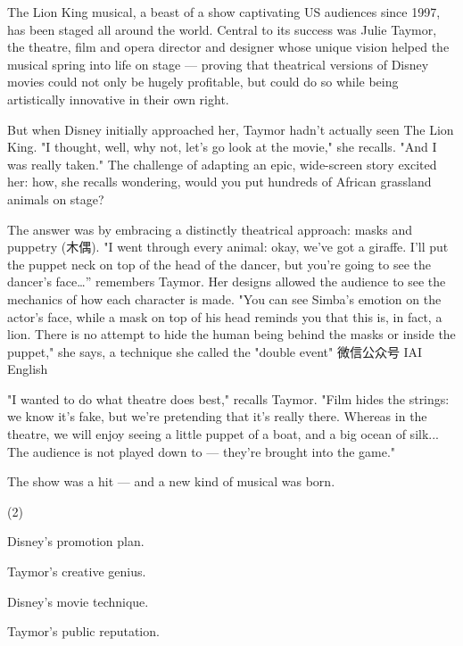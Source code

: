 \documentclass{英语试卷}
\begin{document}
\par The Lion King musical, a beast of a show captivating US audiences since 1997, has been staged all around the world. Central to its success was Julie Taymor, the theatre, film and opera director and designer whose unique vision helped the musical spring into life on stage — proving that theatrical versions of Disney movies could not only be hugely profitable, but could do so while being artistically innovative in their own right.\par
\par But when Disney initially approached her, Taymor hadn't actually seen The Lion King. "I thought, well, why not, let's go look at the movie," she recalls. "And I was really taken." The challenge of adapting an epic, wide-screen story excited her: how, she recalls wondering, would you put hundreds of African grassland animals on stage?\par
\par The answer was by embracing a distinctly theatrical approach: masks and puppetry (木偶). "I went through every animal: okay, we’ve got a giraffe. I’ll put the puppet neck on top of the head of the dancer, but you’re going to see the dancer's face…” remembers Taymor. Her designs allowed the audience to see the mechanics of how each character is made. "You can see Simba's emotion on the actor's face, while a mask on top of his head reminds you that this is, in fact, a lion. There is no attempt to hide the human being behind the masks or inside the puppet," she says, a technique she called the "double event" 微信公众号 IAI English\par
\par "I wanted to do what theatre does best," recalls Taymor. "Film hides the strings: we know it's fake, but we're pretending that it's really there. Whereas in the theatre, we will enjoy seeing a little puppet of a boat, and a big ocean of silk... The audience is not played down to — they're brought into the game."\par
\par The show was a hit — and a new kind of musical was born.\par
{}
\begin{choices}(2)
  \item Disney's promotion plan.
  \item Taymor's creative genius.
  \item Disney's movie technique.
  \item Taymor's public reputation.
\end{choices}
\end{document}
